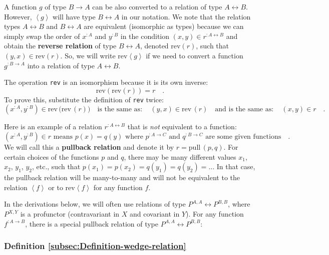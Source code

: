 A function $g$ of type $B\rightarrow A$ can be also converted to
a relation of type $A\leftrightarrow B$. However, $\left<g\right>$
will have type $B\leftrightarrow A$ in our notation. We note that
the relation types $A\leftrightarrow B$ and $B\leftrightarrow A$
are equivalent (isomorphic as types) because we can simply swap the
order of $x^{:A}$ and $y^{:B}$ in the condition $(x,y)\in r^{:A\leftrightarrow B}$
and obtain the \textbf{reverse relation}
of type $B\leftrightarrow A$, denoted $\text{rev}\left(r\right)$,
such that $(y,x)\in\text{rev}\left(r\right)$. So, we will write $\text{rev}\left<g\right>$
if we need to convert a function $g^{:B\rightarrow A}$ into a relation
of type $A\leftrightarrow B$.

The operation \lstinline!rev! is an isomorphism because it is its
own inverse: 
\[
\text{rev}\left(\text{rev}\left(r\right)\right)=r\quad.
\]
To prove this, substitute the definition of \lstinline!rev! twice:
\[
(x^{:A},y^{:B})\in\text{rev}\,\big(\text{rev}\,(r)\big)\quad\text{is the same as}:\quad(y,x)\in\text{rev}\,(r)\quad\text{and is the same as}:\quad(x,y)\in r\quad.
\]

Here is an example of a relation $r^{:A\leftrightarrow B}$ that is
\emph{not} equivalent to a function:
\[
(x^{:A},y^{:B})\in r\text{ means }p(x)=q(y)\text{ where }p^{:A\rightarrow C}\text{ and }q^{:B\rightarrow C}\text{ are some given functions}\quad.
\]
We will call this a \textbf{pullback relation}
and denote it by $r=\text{pull}\,(p,q)$. For certain choices of the
functions $p$ and $q$, there may be many different values $x_{1}$,
$x_{2}$, $y_{1}$, $y_{2}$, etc., such that $p(x_{1})=p(x_{2})=q(y_{1})=q(y_{2})=...$
In that case, the pullback relation will be many-to-many and will
not be equivalent to the relation $\left<f\right>$ or to $\text{rev}\left<f\right>$
for any function $f$. 

In the derivations below, we will often use relations of type $P^{A,A}\leftrightarrow P^{B,B}$,
where $P^{X,Y}$ is a profunctor (contravariant in $X$ and covariant
in $Y$). For any function $f^{:A\rightarrow B}$, there is a special
pullback relation of type $P^{A,A}\leftrightarrow P^{B,B}$: 

\subsubsection{Definition \label{subsec:Definition-wedge-relation}\ref{subsec:Definition-wedge-relation}}

